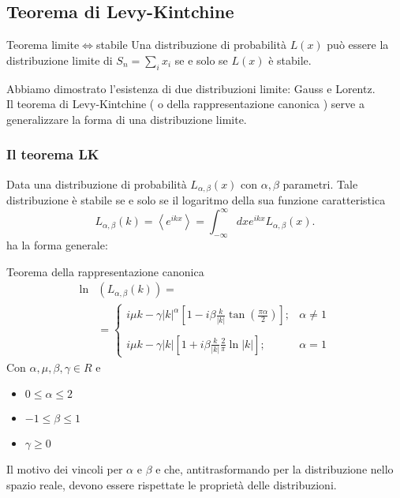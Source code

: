 \subsection{Teorema di Levy-Kintchine}%
\label{sub:Distribuzioni limite}
\begin{bluebox}{Teorema limite$\iff$stabile}
    Una distribuzione di probabilità $L(x)$ può essere la distribuzione limite di $S_n = \sum_{i}^{} x_i$ se e solo se $L(x)$ è stabile.
\end{bluebox}
\noindent
Abbiamo dimostrato l'esistenza di due distribuzioni limite: Gauss e Lorentz.\\
Il teorema di Levy-Kintchine ( o della rappresentazione canonica ) serve a generalizzare la forma di una distribuzione limite.
\subsubsection{Il teorema LK}%
\label{subsub:Il teorema LK}
Data una distribuzione di probabilità $L_{\alpha,\beta}(x)$ con $\alpha,\beta$ parametri. Tale distribuzione è stabile se e solo se il logaritmo della sua funzione caratteristica
\[
    L_{\alpha,\beta  }(k) = \left<e^{ikx}\right> = \int_{-\infty}^{\infty} dx e^{ikx}L_{\alpha,\beta  }(x)  
.\] 
ha la forma generale:
\begin{redbox}{Teorema della rappresentazione canonica}
\[\begin{aligned}
    \ln&(L_{\alpha,\beta}(k)) =\\
       &=\begin{cases}
	   i\mu k-\gamma \left|k\right|^\alpha\left[1-i\beta  \frac{k}{\left|k\right|}\tan\left(\frac{\pi\alpha}{2}\right)\right]; & \alpha\neq 1\\
																   &\\
	   i\mu k-\gamma \left|k\right|\left[1+i\beta  \frac{k}{\left|k\right|} \frac{2}{\pi}\ln\left|k\right|\right]; &\alpha = 1
       \end{cases}
\end{aligned}\]    
Con $\alpha, \mu, \beta,\gamma  \in R$ e
\begin{itemize}
    \item $0\le \alpha\le 2$
    \item $-1\le \beta\le 1$ 
    \item $\gamma\ge 0$ 
\end{itemize}
\end{redbox}
\noindent
Il motivo dei vincoli per $\alpha$ e $\beta$ e che, antitrasformando per la distribuzione nello spazio reale, devono essere rispettate le proprietà delle distribuzioni.
